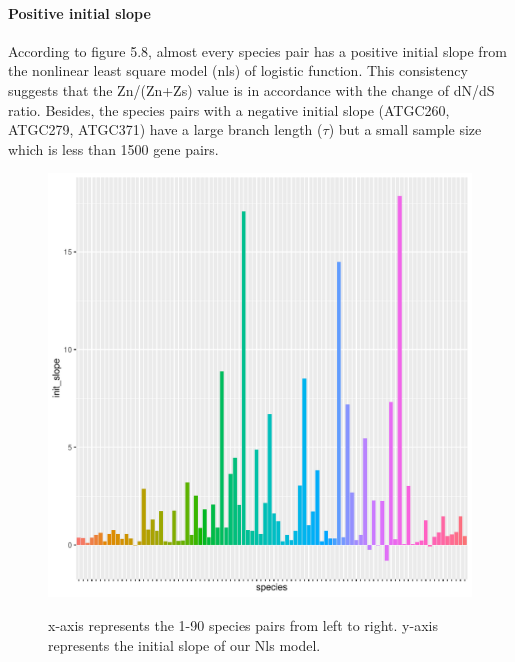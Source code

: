\paragraph{Positive initial slope} According to figure 5.8, almost every species pair has a positive initial slope from the nonlinear least square model (nls) of logistic function. This consistency suggests that the Zn/(Zn+Zs) value is in accordance with the change of dN/dS ratio. Besides, the species pairs with a negative initial slope (ATGC260, ATGC279, ATGC371) have a large branch length ($\tau$) but a small sample size which is less than 1500 gene pairs. 
\begin{figure}[H]
     \centering
     \begin{minipage}[t]{1\textwidth}
     \includegraphics[width=1\linewidth,height=1\linewidth]{Fig7.pdf}
     { {x-axis represents the 1-90 species pairs from left to right. y-axis represents the initial slope of our Nls model.} 
 \par}
     \end{minipage}
\end{figure}

